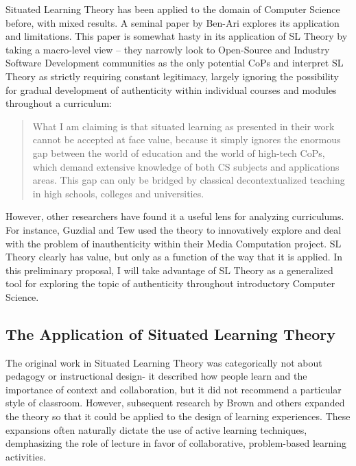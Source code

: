 Situated Learning Theory has been applied to the domain of Computer Science before, with mixed results. A seminal paper by Ben-Ari \cite{ben2004situated} explores its application and limitations. This paper is somewhat hasty in its application of SL Theory by taking a macro-level view -- they narrowly look to Open-Source and Industry Software Development communities as the only potential CoPs and interpret SL Theory as strictly requiring constant legitimacy, largely ignoring the possibility for gradual development of authenticity within individual courses and modules throughout a curriculum:

\begin{quote}
What I am claiming is that situated learning as presented in
their work cannot be accepted at face value, because it simply ignores the
enormous gap between the world of education and the world of high-tech
CoPs, which demand extensive knowledge of both CS subjects and
applications areas. This gap can only be bridged by classical decontextualized
teaching in high schools, colleges and universities.
\end{quote}

However, other researchers have found it a useful lens for analyzing curriculums. For instance, Guzdial and Tew \cite{guzdial2006imagineering} used the theory to innovatively explore and deal with the problem of inauthenticity within their Media Computation project. SL Theory clearly has value, but only as a function of the way that it is applied. In this preliminary proposal, I will take advantage of SL Theory as a generalized tool for exploring the topic of authenticity throughout introductory Computer Science.

\subsection{The Application of Situated Learning Theory}

The original work in Situated Learning Theory was categorically not about pedagogy or instructional design- it described how people learn and the importance of context and collaboration, but it did not recommend a particular style of classroom.
However, subsequent research by Brown \cite{brown1989situated} and others expanded the theory so that it could be applied to the design of learning experiences. These expansions often naturally dictate the use of active learning techniques, demphasizing the role of lecture in favor of collaborative, problem-based learning activities.

